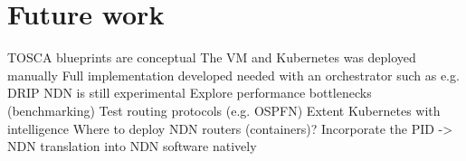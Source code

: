 \section{Future work}\label{fut}
TOSCA blueprints are conceptual
The VM and Kubernetes was deployed manually
Full implementation developed needed with an orchestrator such as e.g. DRIP
NDN is still experimental
Explore performance bottlenecks (benchmarking)
Test routing protocols (e.g. OSPFN)
Extent Kubernetes with intelligence
Where to deploy NDN routers (containers)?
Incorporate the PID -> NDN translation into NDN software natively